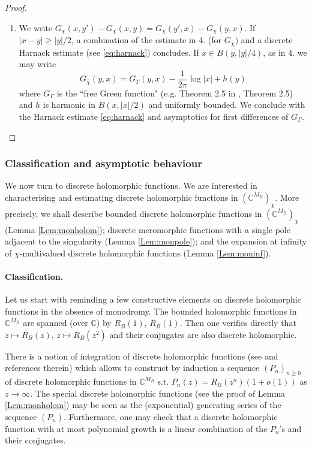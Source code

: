 \documentclass[10pt]{article}
\newcommand{\C}{\mathbb{C}}
\begin{document}
\begin{proof}
\begin{enumerate}
\item We write $G_\chi(x,y')-G_\chi(x,y)=G_{\bar\chi}(y',x)-G_{\bar\chi}(y,x)$. If $|x-y|\geq |y|/2$, a combination of the estimate in 4. (for $G_{\bar\chi})$ and a discrete Harnack estimate (see \eqref{eq:harnack}) concludes. If $x\in B(y,|y|/4)$, as in 4. we may write 
$$G_{\bar\chi}(y,x)=G_\Gamma(y,x)-\frac 1{2\pi}\log|x|+h(y)$$
where $G_\Gamma$ is the ``free Green function" (e.g. Theorem 2.5 in \cite{SmiChe_isoradial}, Theorem 2.5) and $h$ is harmonic in $B(x,|x|/2)$ and uniformly bounded. We conclude with the Harnack estimate \eqref{eq:harnack} and asymptotics for first differences of $G_\Gamma$.

\end{enumerate}
\end{proof}


\subsubsection{Classification and asymptotic behaviour}

We now turn to discrete holomorphic functions. We are interested in characterising and estimating discrete holomorphic functions in $(\C^{M_B})_\chi$. More precisely, we shall describe bounded discrete holomorphic functions in $(\C^{M_B})_\chi$ (Lemma \ref{Lem:monholom}); discrete meromorphic functions with a single pole adjacent to the singularity (Lemma \ref{Lem:monpole}); and the expansion at infinity of $\chi$-multivalued discrete holomorphic functions (Lemma \ref{Lem:moninf}).


\paragraph{Classification.}

Let us start with reminding a few constructive elements on discrete holomorphic functions in the absence of monodromy. The bounded holomorphic functions in $\C^{M_B}$ are spanned (over $\C$) by $R_B(1)$, $\bar R_B(1)$. Then one verifies directly that $z\mapsto R_B(z)$, $z\mapsto R_B(z^2)$ and their conjugates are also discrete holomorphic. 

There is a notion of integration of discrete holomorphic functions (see \cite{Merc_poly} and references therein) which allows to construct by induction a sequence $(P_n)_{n\geq 0}$ of discrete holomorphic functions in $\C^{M_B}$ s.t. $P_n(z)=R_B(z^n)(1+o(1))$ as $z\rightarrow\infty$. The special discrete holomorphic functions (see the proof of Lemma \ref{Lem:monholom}) may be seen as the (exponential) generating series of the sequence $(P_n)$. Furthermore, one may check that a discrete holomorphic function with at most polynomial growth is a linear combination of the $P_n$'s and their conjugates. 
\end{document}
